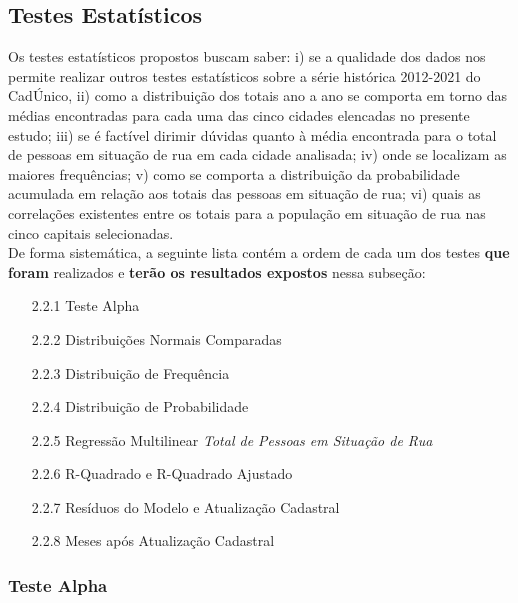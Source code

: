 \documentclass[14pt]{extarticle}
\begin{document}
\subsection{Testes Estatísticos}
\label{testes_estatisticos}

Os testes estatísticos propostos buscam saber: i) se a qualidade dos dados nos permite realizar outros testes estatísticos sobre a série histórica 2012-2021 do CadÚnico, ii) como a distribuição dos totais ano a ano se comporta em torno das médias encontradas para cada uma das cinco cidades elencadas no presente estudo; iii) se é factível dirimir dúvidas quanto à média encontrada para o total de pessoas em situação de rua em cada cidade analisada; iv) onde se localizam as maiores frequências; v) como se comporta a distribuição da probabilidade acumulada em relação aos totais das pessoas em situação de rua; vi) quais as correlações existentes entre os totais para a população em situação de rua nas cinco capitais selecionadas.\\

De forma sistemática, a seguinte lista contém a ordem de cada um dos testes \textbf{que foram} realizados e \textbf{terão os resultados expostos} nessa subseção:

\begin{enumerate}

\begin{itemize}
\item[2.2.1]{Teste Alpha}
\item[2.2.2]{Distribuições Normais Comparadas}
\item[2.2.3]{Distribuição de Frequência}
\item[2.2.4]{Distribuição de Probabilidade}
\item[2.2.5]{Regressão Multilinear \textit{Total de Pessoas em Situação de Rua}}
\item[2.2.6]{R-Quadrado e R-Quadrado Ajustado}
\item[2.2.7]{Resíduos do Modelo e Atualização Cadastral}
\item[2.2.8]{Meses após Atualização Cadastral}
\end{itemize}

\end{enumerate}


\subsubsection{Teste Alpha}
\label{teste_alpha}
\end{document}
